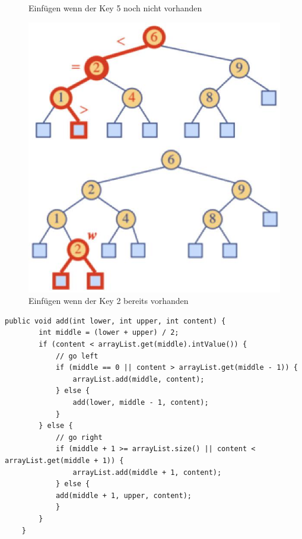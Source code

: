 \begin{description}
\begin{figure}[ht!]
\begin{minipage}[t]{0.4\textwidth}
			\caption{Einfügen wenn der Key 5 noch nicht vorhanden}
			\label{fig:searchtreeinsert1}
		\end{minipage}
		\begin{minipage}[t]{0.4\textwidth}
			\centering
			\includegraphics[width=0.9\linewidth]{images/search_tree_insert_2}
			\caption{Einfügen wenn der Key 2 bereits vorhanden}
			\label{fig:searchtreeinsert2}
		\end{minipage}
	\end{figure}
	
	\clearpage

	\begin{lstlisting}[caption=Arraylist basierter Einsatz]
	public void add(int lower, int upper, int content) {
		int middle = (lower + upper) / 2;
		if (content < arrayList.get(middle).intValue()) {
			// go left
			if (middle == 0 || content > arrayList.get(middle - 1)) {
				arrayList.add(middle, content);
			} else {
				add(lower, middle - 1, content);
			}
		} else {
			// go right
			if (middle + 1 >= arrayList.size() || content < arrayList.get(middle + 1)) {
				arrayList.add(middle + 1, content);
			} else {
			add(middle + 1, upper, content);
			}
		}
	}
	\end{lstlisting}

\clearpage


\end{description}

